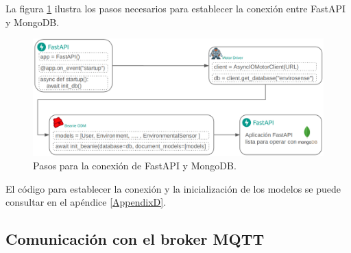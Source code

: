 La figura \ref{fig:conexion mongo} ilustra los pasos necesarios para establecer
la conexión entre FastAPI y MongoDB.

\begin{figure}[H]
    \centering
    \includegraphics[width=.90\textwidth]{./Images/19.png}
    \caption{Pasos para la conexión de FastAPI y MongoDB.}
    \label{fig:conexion mongo}
\end{figure}


El código para establecer la conexión y la inicialización de los modelos se
puede consultar en el apéndice \ref{AppendixD}.


\subsection{Comunicación con el broker MQTT}

